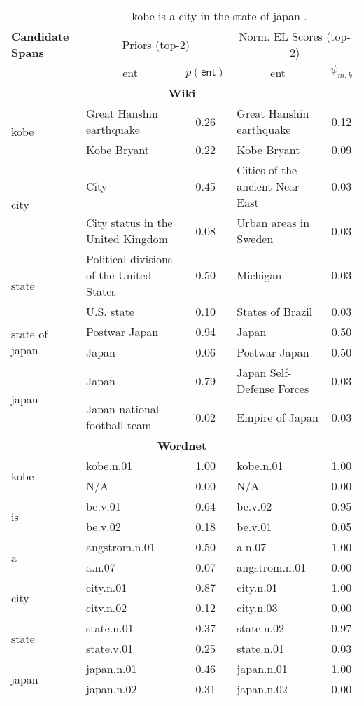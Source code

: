 \begin{table}[t!]
\tiny
\centering
\begin{tabular}{|p{2.4cm}|p{3.2cm}c|p{3.2cm}c|}
\hline
\multirow{3}{*}{\textbf{Candidate Spans}} & \multicolumn{4}{c|}{\textsf{kobe is a city in the state of japan . }} \\
& \multicolumn{2}{c}{Priors (top-2)} & \multicolumn{2}{c|}{Norm. EL Scores (top-2)} \\ \cline{2-5}
& \multicolumn{1}{c|}{\textsf{ent}} & $p(\mathsf{ent})$ & \multicolumn{1}{c|}{\textsf{ent}} & $\psi_{m,k}$ \\ \hline 
\multicolumn{5}{c}{\textbf{\textsf{Wiki}}}\\
\hline
\multirow{2}{*}{\textsf{kobe}}& Great Hanshin earthquake & 0.26 & Great Hanshin earthquake & 0.12\\ 
& Kobe Bryant & 0.22 & Kobe Bryant & 0.09\\\hline 
\multirow{2}{*}{\textsf{city}}& City & 0.45 & Cities of the ancient Near East & 0.03\\ 
& City status in the United Kingdom & 0.08 & Urban areas in Sweden & 0.03\\\hline 
\multirow{2}{*}{\textsf{state}}& Political divisions of the United States & 0.50 & Michigan & 0.03\\ 
& U.S. state & 0.10 & States of Brazil & 0.03\\\hline 
\multirow{2}{*}{\textsf{state of japan}}& Postwar Japan & 0.94 & Japan & 0.50\\ 
& Japan & 0.06 & Postwar Japan & 0.50\\\hline 
\multirow{2}{*}{\textsf{japan}}& Japan & 0.79 & Japan Self-Defense Forces & 0.03\\ 
& Japan national football team & 0.02 & Empire of Japan & 0.03\\\hline 
\multicolumn{5}{c}{\textbf{\textsf{Wordnet}}}\\
\hline
\multirow{2}{*}{\textsf{kobe}}& kobe.n.01 & 1.00 & kobe.n.01 & 1.00\\ 
& N/A & 0.00 & N/A & 0.00\\\hline 
\multirow{2}{*}{\textsf{is}}& be.v.01 & 0.64 & be.v.02 & 0.95\\ 
& be.v.02 & 0.18 & be.v.01 & 0.05\\\hline 
\multirow{2}{*}{\textsf{a}}& angstrom.n.01 & 0.50 & a.n.07 & 1.00\\ 
& a.n.07 & 0.07 & angstrom.n.01 & 0.00\\\hline 
\multirow{2}{*}{\textsf{city}}& city.n.01 & 0.87 & city.n.01 & 1.00\\ 
& city.n.02 & 0.12 & city.n.03 & 0.00\\\hline 
\multirow{2}{*}{\textsf{state}}& state.n.01 & 0.37 & state.n.02 & 0.97\\ 
& state.v.01 & 0.25 & state.n.01 & 0.03\\\hline 
\multirow{2}{*}{\textsf{japan}}& japan.n.01 & 0.46 & japan.n.01 & 1.00\\ 
& japan.n.02 & 0.31 & japan.n.02 & 0.00\\\hline 
\end{tabular}
\end{table}
